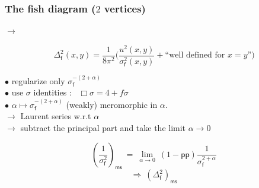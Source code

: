 \documentclass[9pt]{beamer}
\newcommand{\backupend}{
\addtocounter{framenumberappendix}{-\value{framenumber}}
\addtocounter{framenumber}{\value{framenumberappendix}} 
}
\newcommand{\ms}{\mathsf{ms}}
\newcommand{\pp}{\mathsf{pp}}
\newcommand{\fsf}{\mathsf{f}}
\begin{document}
\begin{frame}[label=details_theorem_ex]

\frametitle{The fish diagram ($2$ vertices)}

\vfill

\begin{minipage}{0.2\linewidth}
\centering
\begin{figure}
\end{figure}
\end{minipage}
\hspace*{-8pt}
$\longrightarrow$
\hspace{5pt}
\begin{minipage}{0.7\linewidth}
\vspace*{-13pt}
\begin{equation*}
\Delta_\fsf^2(x,y) = \frac{1}{8 \pi^2} \bigg( \frac{u^2(x,y)}{\sigma_\fsf^2(x,y)} +  
\mbox{``well defined for $x=y$''}
\bigg)
\end{equation*}
\end{minipage}

\vspace*{20pt}

$\bullet$ regularize only $\sigma_\fsf^{-(2+\alpha)}$ \\

$\bullet$ use $\sigma$ identities : \ $ \Box \sigma = 4 + f \sigma $ \\
 
$\bullet$ $\alpha \mapsto \sigma_\fsf^{-(2+\alpha)}$ (weakly) meromorphic in $\alpha$. \\
\quad $\to$ Laurent series w.r.t $\alpha$ \\
\quad $\to$ subtract the principal part and take the limit $\alpha \to 0$
 
\begin{equation*}
\left(\frac{1}{\sigma_\fsf^2}\right)_\ms\ = \ \lim_{\alpha \to 0} \ \left( 1 - \pp \right) \frac{1}{\sigma_\fsf^{2+\alpha}} 
\end{equation*}
\begin{equation*}
\Longrightarrow \ \left(\Delta_\fsf^{2}\right)_\ms
\end{equation*}

\vfill

\hfill\hyperlink{theorem}{}

\end{frame}


\backupend

\end{document}
